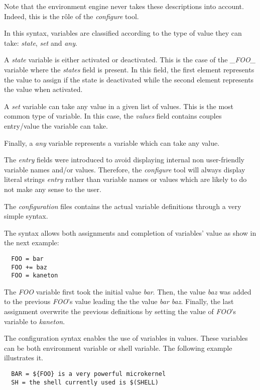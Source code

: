 Note that the environment engine never takes these descriptions into account.
Indeed, this is the r\^ole of the \textit{configure} tool.

In this syntax, variables are classified according to the type of value
they can take: \textit{state}, \textit{set} and \textit{any}.

A \textit{state} variable is either activated or deactivated. This is
the case of the \textit{\_FOO\_} variable where the \textit{states}
field is present. In this field, the first element represents the value
to assign if the state is deactivated while the second element represents
the value when activated.

A \textit{set} variable can take any value in a given list of values. This
is the most common type of variable. In this case, the \textit{values} field
contains couples entry/value the variable can take.

Finally, a \textit{any} variable represents a variable which can take any
value.

The \textit{entry} fields were introduced to avoid displaying internal
non user-friendly variable names and/or values. Therefore, the
\textit{configure} tool will always display literal strings \textit{entry}
rather than variable names or values which are likely to do not make any
sense to the user.



The \textit{configuration} files contains the actual variable definitions
through a very simple syntax.

The syntax allows both assignments and completion of variables' value
as show in the next example:

\begin{verbatim}
  FOO = bar
  FOO += baz
  FOO = kaneton
\end{verbatim}

The \textit{FOO} variable first took the initial value \textit{bar}. Then,
the value \textit{baz} was added to the previous \textit{FOO}'s value
leading the the value \textit{bar baz}. Finally, the last assignment
overwrite the previous definitions by setting the value of \textit{FOO}'s
variable to \textit{kaneton}.

The configuration syntax enables the use of variables in values. These
variables can be both environment variable or shell variable. The following
example illustrates it.

\begin{verbatim}
  BAR = ${FOO} is a very powerful microkernel
  SH = the shell currently used is $(SHELL)
\end{verbatim}

